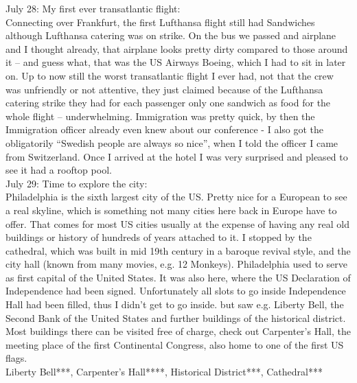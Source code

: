 July 28: My first ever transatlantic flight:\\
Connecting over Frankfurt, the first Lufthansa flight still had Sandwiches although Lufthansa catering was on strike. On the bus we passed and airplane and I thought already, that airplane looks pretty dirty compared to those around it -- and guess what, that was the US Airways Boeing, which I had to sit in later on. Up to now still the worst transatlantic flight I ever had, not that the crew was unfriendly or not attentive, they just claimed because of the Lufthansa catering strike they had for each passenger only one sandwich as food for the whole flight -- underwhelming. Immigration was pretty quick, by then the Immigration officer already even knew about our conference - I also got the obligatorily ``Swedish people are always so nice'', when I told the officer I came from Switzerland. Once I arrived at the hotel I was very surprised and pleased to see it had a rooftop pool.\\

July 29: Time to explore the city:\\
Philadelphia is the sixth largest city of the US. Pretty nice for a European to see a real skyline, which is something not many cities here back in Europe have to offer. That comes for most US cities usually at the expense of having any real old buildings or history of hundreds of years attached to it. I stopped by the cathedral, which was built in mid 19th century in a baroque revival style, and the city hall (known from many movies, e.g. 12 Monkeys). Philadelphia used to serve as first capital of the United States. It was also here, where the US Declaration of Independence had been signed. Unfortunately all slots to go inside Independence Hall had been filled, thus I didn't get to go inside. but saw e.g. Liberty Bell, the Second Bank of the United States and further buildings of the historical district. Most buildings there can be visited free of charge, check out Carpenter's Hall, the meeting place of the first Continental Congress, also home to one of the first US flags.\\

Liberty Bell***, Carpenter's Hall****, Historical District***, Cathedral***\\


